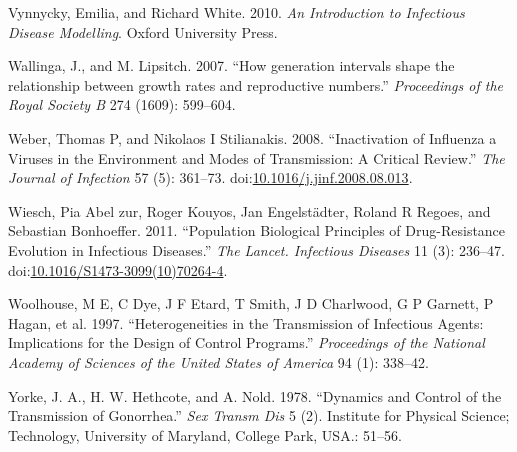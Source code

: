 \documentclass[]{book}
\theoremstyle{definition}
\theoremstyle{definition}
\theoremstyle{definition}
\theoremstyle{remark}
\begin{document}
\hypertarget{ref-vynnycky10}{}
Vynnycky, Emilia, and Richard White. 2010. \emph{An Introduction to
Infectious Disease Modelling}. Oxford University Press.

\hypertarget{ref-wallinga07}{}
Wallinga, J., and M. Lipsitch. 2007. ``How generation intervals shape
the relationship between growth rates and reproductive numbers.''
\emph{Proceedings of the Royal Society B} 274 (1609): 599--604.

\hypertarget{ref-weber08}{}
Weber, Thomas P, and Nikolaos I Stilianakis. 2008. ``Inactivation of
Influenza a Viruses in the Environment and Modes of Transmission: A
Critical Review.'' \emph{The Journal of Infection} 57 (5): 361--73.
doi:\href{https://doi.org/10.1016/j.jinf.2008.08.013}{10.1016/j.jinf.2008.08.013}.

\hypertarget{ref-wiesch11}{}
Wiesch, Pia Abel zur, Roger Kouyos, Jan Engelstädter, Roland R Regoes,
and Sebastian Bonhoeffer. 2011. ``Population Biological Principles of
Drug-Resistance Evolution in Infectious Diseases.'' \emph{The Lancet.
Infectious Diseases} 11 (3): 236--47.
doi:\href{https://doi.org/10.1016/S1473-3099(10)70264-4}{10.1016/S1473-3099(10)70264-4}.

\hypertarget{ref-woolhouse97}{}
Woolhouse, M E, C Dye, J F Etard, T Smith, J D Charlwood, G P Garnett, P
Hagan, et al. 1997. ``Heterogeneities in the Transmission of Infectious
Agents: Implications for the Design of Control Programs.''
\emph{Proceedings of the National Academy of Sciences of the United
States of America} 94 (1): 338--42.

\hypertarget{ref-yorke78}{}
Yorke, J. A., H. W. Hethcote, and A. Nold. 1978. ``Dynamics and Control
of the Transmission of Gonorrhea.'' \emph{Sex Transm Dis} 5 (2).
Institute for Physical Science; Technology, University of Maryland,
College Park, USA.: 51--56.
\end{document}
